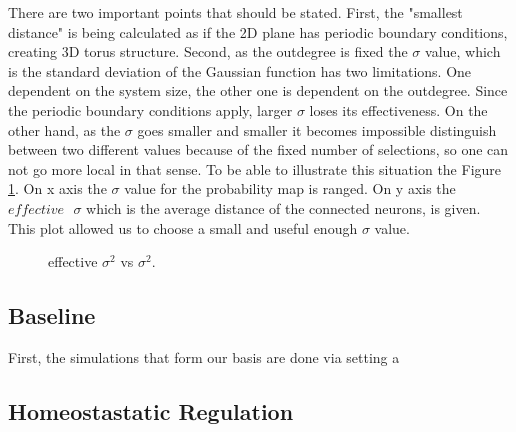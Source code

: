 \documentclass[letterpaper,12pt]{article}
\begin{document}
There are two important points that should be stated. First, the "smallest distance" is being calculated as if the 2D plane has periodic boundary conditions, creating 3D torus structure. Second, as the outdegree is fixed the $\sigma$ value, which is the standard deviation of the Gaussian function has two limitations. One dependent on the system size, the other one is dependent on the outdegree. Since the periodic boundary conditions apply, larger $\sigma$ loses its effectiveness. On the other hand, as the $\sigma$ goes smaller and smaller it becomes impossible distinguish between two different values because of the fixed number of selections, so one can not go more local in that sense. To be able to illustrate this situation the Figure \ref{effectivesigma}. On x axis the $\sigma$ value for the probability map is ranged. On y axis the $effective \text{ } \sigma$ which is the average distance of the connected neurons, is given. This plot allowed us to choose a small and useful enough $\sigma$ value. 
\begin{figure}[htbp] 
    \caption{effective $\sigma ^2$ vs $\sigma ^2$.}
    \label{effectivesigma}
\end{figure}



\subsection{Baseline}
First, the simulations that form our basis are done via setting a  
\subsection{Homeostastatic Regulation}
\end{document}
